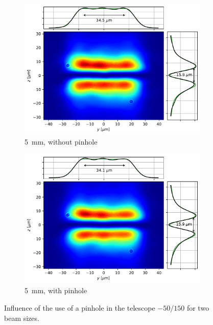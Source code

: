 \begin{figure}
\begin{subfigure}{0.45\textwidth}
        \includegraphics[width=\textwidth]{chapters/chapter_3/figures/small_nopin.pdf}
        \caption{\SI{5}{mm}, without pinhole}
    \end{subfigure}
    \hfill
    \begin{subfigure}{0.45\textwidth}
        \includegraphics[width=\textwidth]{chapters/chapter_3/figures/small_pin.pdf}
        \caption{\SI{5}{mm}, with pinhole}
    \end{subfigure}
    \caption{Influence of the use of a pinhole in the telescope $-50/150$ for two beam sizes.}
    \label{fig:pin}
\end{figure}

